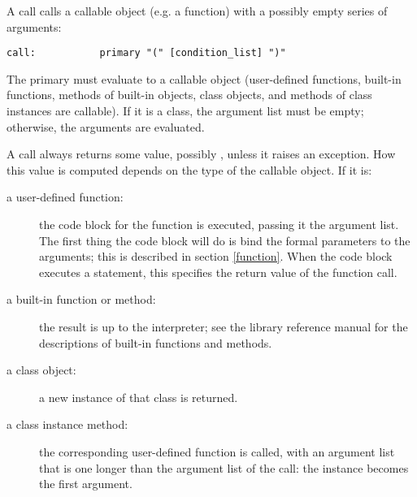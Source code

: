 A call calls a callable object (e.g. a function) with a possibly empty
series of arguments:

\begin{verbatim}
call:           primary "(" [condition_list] ")"
\end{verbatim}

The primary must evaluate to a callable object (user-defined
functions, built-in functions, methods of built-in objects, class
objects, and methods of class instances are callable).  If it is a
class, the argument list must be empty; otherwise, the arguments are
evaluated.

A call always returns some value, possibly \verb@None@, unless it
raises an exception.  How this value is computed depends on the type
of the callable object.  If it is:

\begin{description}

\item[a user-defined function:] the code block for the function is
executed, passing it the argument list.  The first thing the code
block will do is bind the formal parameters to the arguments; this is
described in section \ref{function}.  When the code block executes a
\verb@return@ statement, this specifies the return value of the
function call.

\item[a built-in function or method:] the result is up to the
interpreter; see the library reference manual for the descriptions of
built-in functions and methods.

\item[a class object:] a new instance of that class is returned.

\item[a class instance method:] the corresponding user-defined
function is called, with an argument list that is one longer than the
argument list of the call: the instance becomes the first argument.

\end{description}

